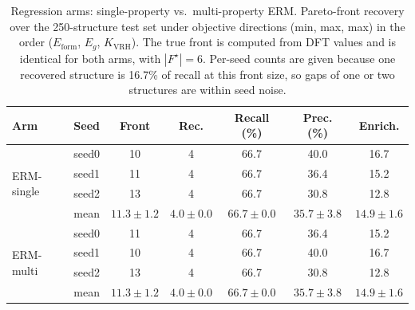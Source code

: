 \begin{table}[htbp]
\renewcommand{\arraystretch}{1.2}
\setlength{\tabcolsep}{4pt}
\caption{Regression arms: single-property vs.\ multi-property ERM. Pareto-front recovery over the 250-structure test set under objective directions (min, max, max) in the order ($E_\mathrm{form}$, $E_g$, $K_\mathrm{VRH}$). The true front is computed from DFT values and is identical for both arms, with $|F^\star|{=}6$. Per-seed counts are given because one recovered structure is 16.7\% of recall at this front size, so gaps of one or two structures are within seed noise.}
\label{tab:pareto_arms_erm}
\centering
\footnotesize
\begin{tabular}{@{}llccccc@{}}
\hline\hline
\textbf{Arm} & \textbf{Seed} & \textbf{Front} & \textbf{Rec.} & \textbf{Recall (\%)} & \textbf{Prec. (\%)} & \textbf{Enrich.} \\
\hline
\multirow{4}{*}{ERM-single}
  & seed0 & 10 & 4 & 66.7 & 40.0 & 16.7 \\
  & seed1 & 11 & 4 & 66.7 & 36.4 & 15.2 \\
  & seed2 & 13 & 4 & 66.7 & 30.8 & 12.8 \\
  & mean & $11.3 \pm 1.2$ & $4.0 \pm 0.0$ & $66.7 \pm 0.0$ & $35.7 \pm 3.8$ & $14.9 \pm 1.6$ \\
\hline
\multirow{4}{*}{ERM-multi}
  & seed0 & 11 & 4 & 66.7 & 36.4 & 15.2 \\
  & seed1 & 10 & 4 & 66.7 & 40.0 & 16.7 \\
  & seed2 & 13 & 4 & 66.7 & 30.8 & 12.8 \\
  & mean & $11.3 \pm 1.2$ & $4.0 \pm 0.0$ & $66.7 \pm 0.0$ & $35.7 \pm 3.8$ & $14.9 \pm 1.6$ \\
\hline\hline
\end{tabular}
\end{table}
